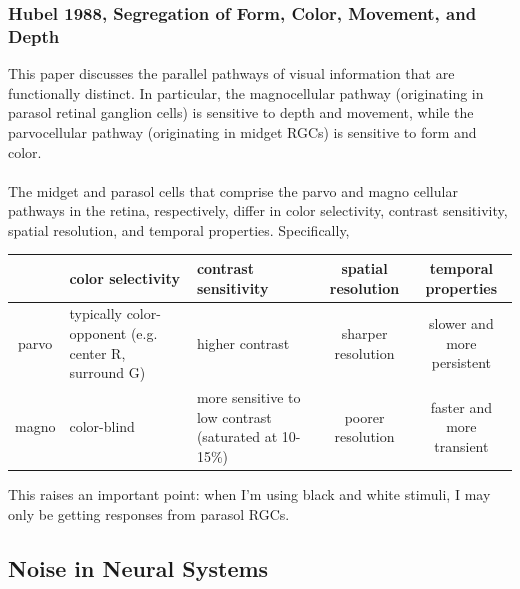 \documentclass{article}
\begin{document}
\subsubsection{Hubel 1988, Segregation of Form, Color, Movement, and Depth}
This paper discusses the parallel pathways of visual information that are functionally distinct.  In particular, the magnocellular pathway (originating in parasol retinal ganglion cells) is sensitive to depth and movement, while the parvocellular pathway (originating in midget RGCs) is sensitive to form and color. \\
\\
The midget and parasol cells that comprise the parvo and magno cellular pathways in the retina, respectively, differ in color selectivity, contrast sensitivity, spatial resolution, and temporal properties.  Specifically, \\
\begin{tabular}{|c|p{4.5cm}|p{3.5cm}|c|c|} \hline
 	   & color selectivity & contrast sensitivity & spatial resolution & temporal properties \\ \hline
 parvo & typically color-opponent (e.g. center R, surround G) & higher contrast & sharper resolution & slower and more persistent \\ \hline
 magno & color-blind & more sensitive to low contrast (saturated at 10-15\%) & poorer resolution & faster and more transient \\ \hline
\end{tabular}

This raises an important point: when I'm using black and white stimuli, I may only be getting responses from parasol RGCs. 



\subsection{Noise in Neural Systems}
\end{document}
